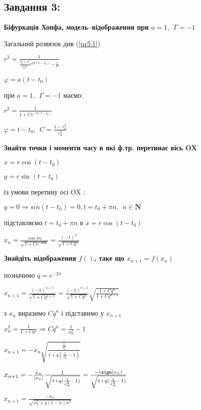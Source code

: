 \subsection{Завдання 3:}

\textbf{Біфуркація Хопфа, модель--відображення при $a=1,\ \ \Gamma = -1$}

Загальний розвязок див (\ref{pr5:1})

$r^2 = \frac{1}{\frac{r^2_0+\Gamma}{r_0^2\Gamma}e^{2\Gamma (t- t_0)} - \frac{1}{\Gamma}}$

$\varphi = a(t-t_0)$

при $a=1,\ \ \Gamma = -1$ маємо:

$r^2 = \frac{1}{1+Ce^{-2(t-t_0)}}$

$\varphi = t - t_0, \ \ C = \frac{1-r_0^2}{r_0^2}$

\textbf{Знайти точки і моменти часу в які ф.тр. перетинає вісь OX }

$x = r\cos(t - t_0)$

$y = r\sin(t-t_0)$

із умови перетину осі OX :

$y = 0 \Longrightarrow sin(t - t_0) = 0, t = t_0 + \pi n, \ \ n\in\mathbf{N}$

підставляємо $t =  t_0 + \pi n$ в $x = r\cos(t - t_0)$

$x_n = \frac{\cos\pi n}{\sqrt{1+Ce^{-2\pi n}}} = \frac{(-1)^n}{\sqrt{1+Cq^n}}$

\textbf{Знайдіть відображення $f()$, таке що $x_{n+1} = f(x_n)$}

позначимо $q = e^{-2\pi}$

$x_{n+1} = \frac{(-1)^{n+1}}{\sqrt{1+Cq^{n+1}}} = \frac{(-1)^{n+1}}{\sqrt{1+Cq^{n}}}\sqrt{\frac{1+Cq^n}{1+Cq^{n+1}}}$

з $x_n$ виразимо $Cq^n$ і підставимо у $x_{n+1}$

$x_n^2 = \frac{1}{1+Cq^n} \Longrightarrow Cq^n = \frac{1}{x_n^2} - 1$

$x_{n+1} = -x_n\sqrt{\frac{\frac{1}{x_n^2}}{1+q(\frac{1}{x_n^2} - 1)}}$

$x_{n+1} = -\frac{x_n}{|x_n|} \frac{1}{\sqrt{1+q(\frac{1}{x_n^2} - 1)}} = 
\frac{-\sign(x_n)}{\sqrt{1+q(\frac{1}{x_n^2} - 1)}}$

$x_{n+1} = \frac{-x_n}{\sqrt{x_n^2 + q(1-x)n^2}}$